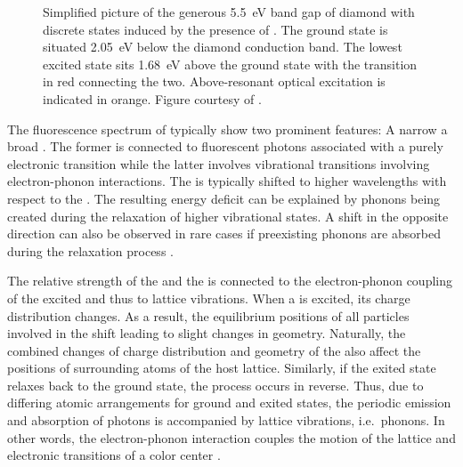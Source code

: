    \begin{figure}[htbp]
      \centering
      \caption[Band gap of \sivs hosted in diamond]{Simplified picture of the generous \SI{5.5}{\eV} band gap of diamond with discrete states induced by the presence of \sivs. The \siv ground state is situated \SI{2.05}{\eV} below the diamond conduction band. The lowest excited state sits \SI{1.68}{\eV} above the ground state with the \zpl transition in red connecting the two. Above-resonant optical excitation is indicated in orange. Figure courtesy of \cite{becker::thesis}.}
      \label{fig::above_resonant_excitation}
    \end{figure}

    The fluorescence spectrum of \sivs typically show two prominent features: A narrow \zpl a broad \psb. The former is connected to fluorescent photons associated with a purely electronic transition while the latter involves vibrational transitions involving electron-phonon interactions. The \psb is typically shifted to higher wavelengths with respect to the \zpl. The resulting energy deficit can be explained by phonons being created during the relaxation of higher vibrational states. A shift in the opposite direction can also be observed in rare cases if preexisting phonons are absorbed during the relaxation process \cite{becker::36}.

    The relative strength of the \zpl and the \psb is connected to the electron-phonon coupling of the excited \cc and thus to lattice vibrations. When a \cc is excited, its charge distribution changes. As a result, the equilibrium positions of all particles involved in the \cc shift leading to slight changes in \cc geometry. Naturally, the combined changes of charge distribution and geometry of the \cc also affect the positions of surrounding atoms of the host lattice. Similarly, if the exited state relaxes back to the ground state, the process occurs in reverse. Thus, due to differing atomic arrangements for ground and exited states, the periodic emission and absorption of photons is accompanied by lattice vibrations, i.e.\ phonons. In other words, the electron-phonon interaction couples the motion of the lattice and electronic transitions of a color center \cite{Davies1981, Zaitsev2000}.


